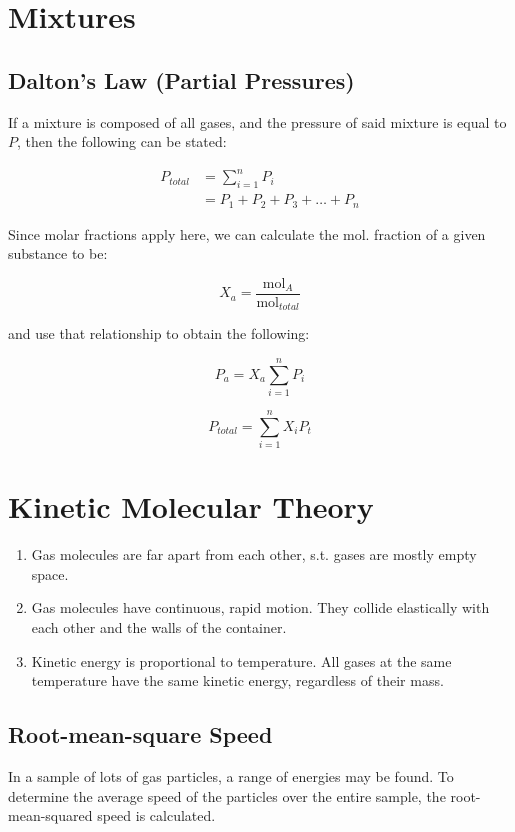 \section{Mixtures}
\subsection{Dalton's Law (Partial Pressures)}
If a mixture is composed of all gases, and the pressure of said mixture is equal
to $P$, then the following can be stated:

\begin{equation}
\begin{split}
  P_{total} &= \sum_{i=1}^{n} P_i\\
  &= P_1 + P_2 + P_3 + \ldots + P_n
\end{split}
\end{equation}

Since molar fractions apply here, we can calculate the mol. fraction of a given
substance to be:

\begin{equation}
  X_a=\frac{\text{mol}_A}{\text{mol}_{total}}
\end{equation}

and use that relationship to obtain the following:

\begin{equation}
  P_a=X_a\sum_{i=1}^{n}P_i
\end{equation}

\begin{equation}
  P_{total} = \sum_{i=1}^{n} X_iP_t
\end{equation}

\section{Kinetic Molecular Theory}
\begin{enumerate}
  \item Gas molecules are far apart from each other, s.t. gases are mostly empty
    space.
  \item Gas molecules have continuous, rapid motion. They collide elastically
    with each other and the walls of the container.
  \item Kinetic energy is proportional to temperature. All gases at the same
    temperature have the same kinetic energy, regardless of their mass.
\end{enumerate}

\subsection{Root-mean-square Speed}
In a sample of lots of gas particles, a range of energies may be found. To
determine the average speed of the particles over the entire sample, the
root-mean-squared speed is calculated.

